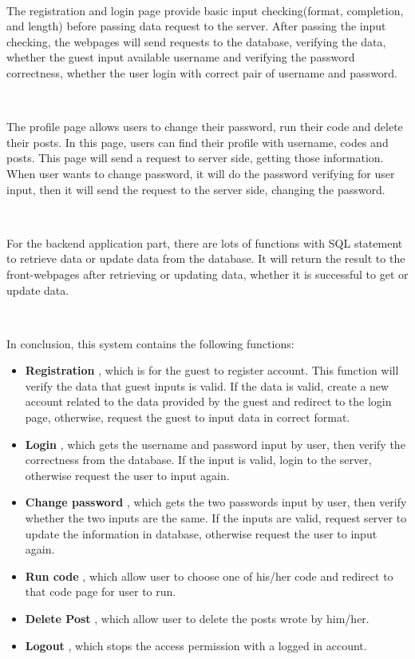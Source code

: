 ~

The registration and login page provide basic input checking(format, completion, and length) before passing data request to the server. After passing the input checking, the webpages will send requests to the database, verifying the data, whether the guest input available username and verifying the password correctness, whether the user login with correct pair of username and password.

~

The profile page allows users to change their password, run their code and delete their posts. In this page, users can find their profile with username, codes and posts. This page will send a request to server side, getting those information. When user wants to change password, it will do the password verifying for user input, then it will send the request to the server side, changing the password.

~

For the backend application part, there are lots of functions with SQL statement to retrieve data or update data from the database. It will return the result to the front-webpages after retrieving or updating data, whether it is successful to get or update data.

~

In conclusion, this system contains the following functions:

\begin{itemize}

\item
\textbf{Registration}
, which is for the guest to register account. This function will verify the data that guest inputs is valid. If the data is valid, create a new account related to the data provided by the guest and redirect to the login page, otherwise, request the guest to input data in correct format.\newline

\item
\textbf{Login}
, which gets the username and password input by user, then verify the correctness from the database. If the input is valid, login to the server, otherwise request the user to input again.\newline

\item
\textbf{Change password}
, which gets the two passwords input by user, then verify whether the two inputs are the same. If the inputs are valid, request server to update the information in database, otherwise request the user to input again.\newline

\item
\textbf{Run code}
, which allow user to choose one of his/her code and redirect to that code page for user to run.

\item
\textbf{Delete Post}
, which allow user to delete the posts wrote by him/her.

\item
\textbf{Logout}
, which stops the access permission with a logged in account.

\end{itemize}
\clearpage

